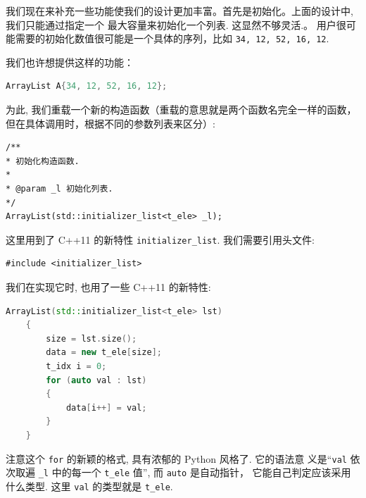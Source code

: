 \documentclass[a4paper]{ctexart}
\theoremstyle{definition}
\theoremstyle{definition}
\begin{document}

% 

我们现在来补充一些功能使我们的设计更加丰富。首先是初始化。上面的设计中, 我们只能通过指定一个
最大容量来初始化一个列表. 这显然不够灵活.。
用户很可能需要的初始化数值很可能是一个具体的序列，比如 \verb|34, 12, 52, 16, 12|.

我们也许想提供这样的功能：
\begin{lstlisting}[language=C++]
ArrayList A{34, 12, 52, 16, 12};
\end{lstlisting}

为此, 我们重载一个新的构造函数（重载的意思就是两个函数名完全一样的函数，但在具体调用时，根据不同的参数列表来区分）:

\begin{verbatim}
/** 
* 初始化构造函数.
* 
* @param _l 初始化列表.
*/
ArrayList(std::initializer_list<t_ele> _l);
\end{verbatim}

这里用到了 C++11 的新特性 \verb|initializer_list|. 我们需要引用头文件:
\begin{verbatim}
#include <initializer_list>
\end{verbatim}
我们在实现它时, 也用了一些 C++11 的新特性:
\begin{lstlisting}[language=C++]
	ArrayList(std::initializer_list<t_ele> lst)
	{
		size = lst.size();
		data = new t_ele[size];
		t_idx i = 0;
		for (auto val : lst)
		{
			data[i++] = val;
		}
	}
\end{lstlisting}


注意这个 \verb|for| 的新颖的格式, 具有浓郁的 Python 风格了. 它的语法意
义是``\verb|val| 依次取遍 \verb|_l| 中的每一个 \verb|t_ele| 值'', 而 \verb|auto| 是自动指针，
它能自己判定应该采用什么类型. 这里 \verb|val| 的类型就是 \verb|t_ele|. 
\end{document}
